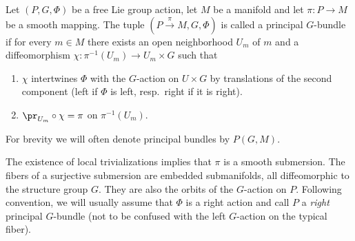 \begin{defn}\label{def pfb 2}
    Let $(P,G,\Phi)$ be a free Lie group action, let $M$ be a manifold and let $\pi:P\to M$ be a smooth mapping. The tuple $(P\overset{\pi}{\to}M,G,\Phi)$ is called a principal $G$-bundle if for every $m\in M$ there exists an open neighborhood $U_m$ of $m$ and a diffeomorphism $\chi:\pi^{-1}(U_m)\to U_m\times G$ such that
    \begin{enumerate}
        \item $\chi$ intertwines $\Phi$ with the $G$-action on $U\times G$ by translations of the second component (left if $\Phi$ is left, resp.\ right if it is right).
        \item $\pr_{U_m}\circ \chi=\pi$ on $\pi^{-1}(U_m)$.
    \end{enumerate}
    For brevity we will often denote principal bundles by $P(G,M)$.
\end{defn}

The existence of local trivializations implies that $\pi$ is a smooth submersion. The fibers of a surjective submersion are embedded submanifolds, all diffeomorphic to the structure group $G$. They are also the orbits of the $G$-action on $P$. Following convention, we will usually assume that $\Phi$ is a right action and call $P$ a \emph{right} principal $G$-bundle (not to be confused with the left $G$-action on the typical fiber).


